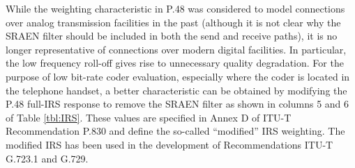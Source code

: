 While the weighting characteristic in P.48 was considered to model
connections over analog transmission facilities in the past
(although it is not clear why the SRAEN filter should be included in
both the send and receive paths), it is no longer representative of
connections over modern digital facilities. In particular, the low
frequency roll-off gives rise to unnecessary quality degradation.
For the purpose of low bit-rate coder evaluation, especially where
the coder is located in the telephone handset, a better
characteristic can be obtained by modifying the P.48 full-IRS
response to remove the SRAEN filter as shown in columns 5 and 6 of
Table \ref{tbl:IRS}. These values are specified in Annex D of
ITU-T Recommendation P.830 \cite{P.830} and define the so-called
``modified'' IRS weighting. The modified IRS has been used in the
development of Recommendations ITU-T G.723.1 and G.729.

